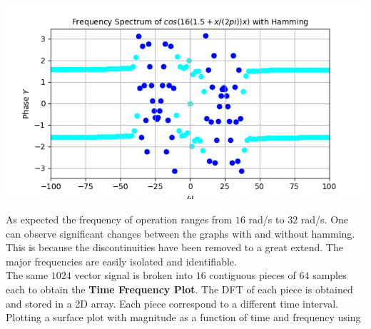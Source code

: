 \documentclass[12pt, a4paper]{report}
\begin{document}
\begin{center}
	\includegraphics[scale=0.8]{Figure_25.png} 
	\label{fig:rawdata}
\end{center}
As expected the frequency of operation ranges from $16$ rad/s to $32$ rad/s. One can observe significant changes between the graphs with and without hamming. This is because the discontinuities have been removed to a great extend. The major frequencies are easily isolated and identifiable.
\\

The same $1024$ vector signal is broken into $16$ contiguous pieces of $64$ samples each to obtain the \textbf{Time Frequency Plot}. The DFT of each piece is obtained and stored in a 2D array. Each piece correspond to a different time interval. Plotting a surface plot with magnitude as a function of time and frequency using
\end{document}
